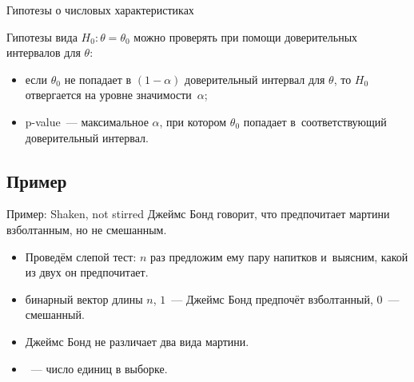 \documentclass[11pt,pdf,utf8,hyperref={unicode},aspectratio=169]{beamer}
\begin{document}
\begin{frame}{Гипотезы о числовых характеристиках}

    Гипотезы вида $H_0\colon \theta=\theta_0$ можно проверять при помощи доверительных интервалов для $\theta$:
    \begin{itemize}
        \item если $\theta_0$ не попадает в $(1-\alpha)$ доверительный интервал для $\theta$, то $H_0$ отвергается на уровне значимости~$\alpha$;
        \item p-value~--- максимальное $\alpha$, при котором $\theta_0$ попадает в~соответствующий доверительный интервал.
    \end{itemize}
\end{frame}

\subsection{Пример}
\begin{frame}{Пример: Shaken, not stirred}
%
	Джеймс Бонд говорит, что предпочитает мартини взболтанным, но не смешанным.

    \begin{itemize}
    \item Проведём слепой тест: $n$ раз предложим ему пару напитков и~выясним, какой из двух он предпочитает.

	\item {} бинарный вектор длины $n$, $1$~--- Джеймс Бонд предпочёт взболтанный, $0$~--- смешанный.


	\item {} Джеймс Бонд не различает два вида мартини.

	\bigskip

	\item {}~--- число единиц в выборке.
    \end{itemize}
\end{frame}
\end{document}
